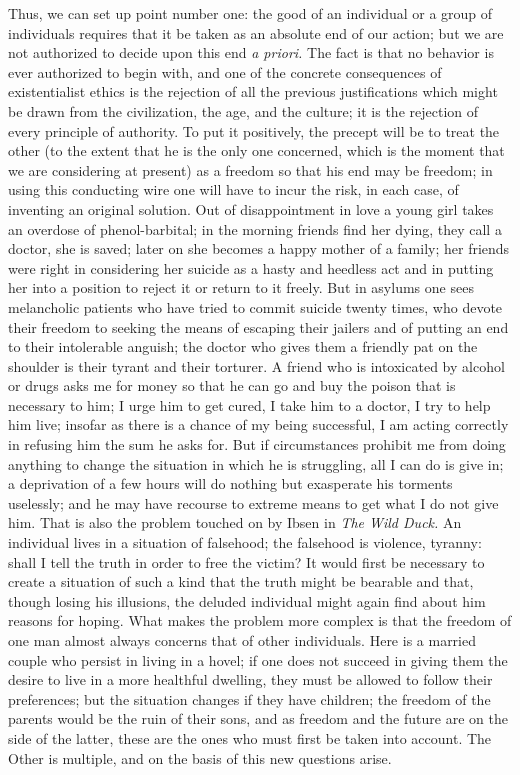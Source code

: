\documentclass[11pt]{article}
\begin{document}
{{Thus, we can set up point number one: the good of an individual or a group of individuals requires that it be taken as an absolute end of our action; but we are not authorized to decide upon this end \textit{a priori. }The fact is that no behavior is ever authorized to begin with, and one of the concrete consequences of existentialist ethics is the rejection of all the previous justifications which might be drawn from the civilization, the age, and the culture; it is the rejection of every principle of authority. To put it positively, the precept will be to treat the other (to the extent that he is the only one concerned, which is the moment that we are considering at present) as a freedom so that his end may be freedom; in using this conducting wire one will have to incur the risk, in each case, of inventing an original solution. Out of disappointment in love a young girl takes an overdose of phenol-barbital; in the morning friends find her dying, they call a doctor, she is saved; later on she becomes a happy mother of a family; her friends were right in considering her suicide as a hasty and heedless act and in putting her into a position to reject it or return to it freely. But in asylums one sees melancholic patients who have tried to commit suicide twenty times, who devote their freedom to seeking the means of escaping their jailers and of putting an end to their intolerable anguish; the doctor who gives them a friendly pat on the shoulder is their tyrant and their torturer. A friend who is intoxicated by alcohol or drugs asks me for money so that he can go and buy the poison that is necessary to him; I urge him to get cured, I take him to a doctor, I try to help him live; insofar as there is a chance of my being successful, I am acting correctly in refusing him the sum he asks for. But if circumstances prohibit me from doing anything to change the situation in which he is struggling, all I can do is give in; a deprivation of a few hours will do nothing but exasperate his torments uselessly; and he may have recourse to extreme means to get what I do not give him. That is also the problem touched on by Ibsen in \textit{The Wild Duck. }An individual lives in a situation of falsehood; the falsehood is violence, tyranny: shall I tell the truth in order to free the victim? It would first be necessary to create a situation of such a kind that the truth might be bearable and that, though losing his illusions, the deluded individual might again find about him reasons for hoping. What makes the problem more complex is that the freedom of one man almost always concerns that of other individuals. Here is a married couple who persist in living in a hovel; if one does not succeed in giving them the desire to live in a more healthful dwelling, they must be allowed to follow their preferences; but the situation changes if they have children; the freedom of the parents would be the ruin of their sons, and as freedom and the future are on the side of the latter, these are the ones who must first be taken into account. The Other is multiple, and on the basis of this new questions arise.

}}
\end{document}
